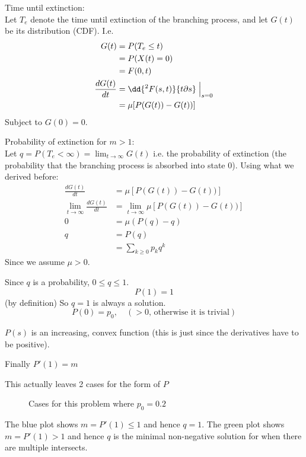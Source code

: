\documentclass{X:/Documents/Coding/Latex/myassignment}
\begin{document}
Time until extinction:\\
Let $T_e$ denote the time until extinction of the branching process, and let $G(t)$ be its distribution (CDF). I.e. 
\begin{align*}
    G(t) &= P(T_e \leq t)\\
    &= P(X(t) = 0)\\
    &= F(0,t)\\
    \frac{dG(t)}{dt} &=\dd{^2F(s,t)}{t\partial s} \Bigm|_{s=0}\\
    &= \mu[P(G(t)) - G(t))]\\
\end{align*}
Subject to $G(0) = 0$.

Probability of extinction for $m > 1$:\\
Let $q = P(T_e < \infty) = \lim_{t\to\infty} G(t)$ i.e. the probability of extinction (the probability that the branching process is absorbed into state 0). Using what we derived before:
\begin{align*}
    \frac{dG(t)}{dt} &= \mu[P(G(t)) - G(t))]\\
    \lim_{t\to\infty}\frac{dG(t)}{dt} &= \lim_{t\to\infty}\mu[P(G(t)) - G(t))]\\
    0 &= \mu (P(q) - q)\\
    q &= P(q)\\
    &= \sum_{k\geq0}p_k q^k
\end{align*}
Since we assume $\mu > 0$.

Since $q$ is a probability, $0\leq q \leq 1$. 
\[P(1) =1 \]
(by definition) So $q=1$ is always a solution.
\[P(0) = p_0,\quad (>0 \text{, otherwise it is trivial})\]

$P(s)$ is an increasing, convex function (this is just since the derivatives have to be positive).

Finally $P'(1) = m$


This actually leaves 2 cases for the form of $P$

\begin{figure}[h]
\centering
{}
\caption{Cases for this problem where $p_0 =0.2$}
\end{figure}
The blue plot shows $m=P'(1) \leq 1$ and hence $q=1$.
The green plot shows $m = P'(1) >1$ and hence $q$ is the minimal non-negative solution for when there are multiple intersects.
\end{document}
